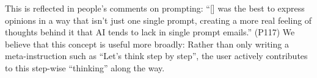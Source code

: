 This is reflected in people's comments on prompting: ``[\modeours] was the best to express opinions in a way that isn't just one single prompt, creating a more real feeling of thoughts behind it that AI tends to lack in single prompt emails.'' (P117) %
We believe that this concept is useful more broadly: Rather than only writing a meta-instruction such as ``Let's think step by step'', the user actively contributes to this step-wise ``thinking'' along the way.
